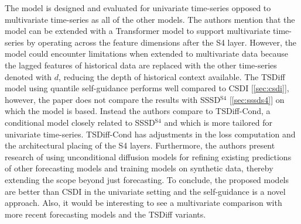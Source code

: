 The model is designed and evaluated for univariate time-series opposed to multivariate time-series as all of the other models. The authors mention that the model can be extended with a Transformer \cite{vaswani_attention_2017} model to support multivariate time-series by operating across the feature dimensions after the S4 layer. However, the model could encounter limitations when extended to multivariate data because the lagged features of historical data are replaced with the other time-series denoted with $d$, reducing the depth of historical context available.
The TSDiff model using quantile self-guidance performs well compared to CSDI [\ref{sec:csdi}], however, the paper does not compare the results with SSSD$^{\text{S4}}$ [\ref{sec:sssds4}] on which the model is based. Instead the authors compare to TSDiff-Cond, a conditional model closely related to SSSD$^{\text{S4}}$ and which is more tailored for univariate time-series. TSDiff-Cond has adjustments in the loss computation and the architectural placing of the S4 layers. 
Furthermore, the authors present research of using unconditional diffusion models for refining existing predictions of other forecasting models and training models on synthetic data, thereby extending the scope beyond just forecasting. To conclude, the proposed models are better than CSDI in the univariate setting and the self-guidance is a novel approach. Also, it would be interesting to see a multivariate comparison with more recent forecasting models and the TSDiff variants.
